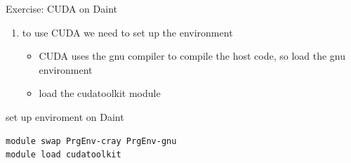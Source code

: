 \begin{frame}[fragile]{Exercise: CUDA on Daint}
    \begin{enumerate}
        \item to use CUDA we need to set up the environment
        \begin{itemize}
            \item CUDA uses the gnu compiler to compile the host code, so load the gnu environment
            \item load the cudatoolkit module
        \end{itemize}
    \end{enumerate}

\begin{code}{set up enviroment on Daint}
\begin{lstlisting}[]
module swap PrgEnv-cray PrgEnv-gnu
module load cudatoolkit
\end{lstlisting}
\end{code}

\end{frame}
